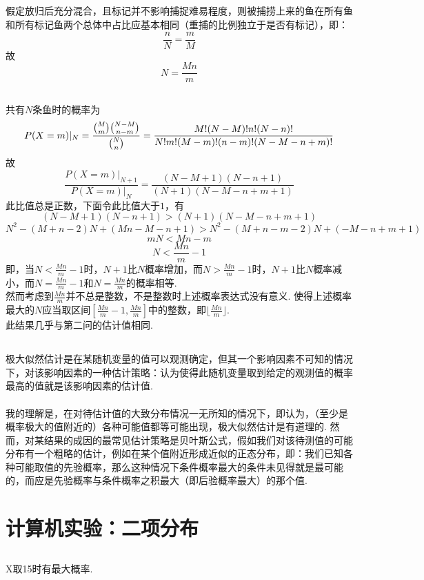\documentclass{article}
\begin{document}
\begin{CJK}{UTF8}{gbsn}
\subsection{}
假定放归后充分混合，且标记并不影响捕捉难易程度，则被捕捞上来的鱼在所有鱼和所有标记鱼两个总体中占比应基本相同（重捕的比例独立于是否有标记），即：
$$\frac{n}{N}=\frac{m}{M}$$
故
$$N=\frac{Mn}{m}$$
\subsection{}
共有$N$条鱼时的概率为
$$ P(X=m)|_{N}=\frac{\tbinom{M}{m}\tbinom{N-M}{n-m}}{\tbinom{N}{n}}=\frac{M!(N-M)!n!(N-n)!}{N!m!(M-m)!(n-m)!(N-M-n+m)!}$$
故
$$ \frac{P(X=m)|_{N+1}}{P(X=m)|_{N}}=\frac{(N-M+1)(N-n+1)}{(N+1)(N-M-n+m+1)}$$
此比值总是正数，下面令此比值大于$1$，有
$$ (N-M+1)(N-n+1)>(N+1)(N-M-n+m+1) $$
$$ N^{2}-(M+n-2)N+(Mn-M-n+1)>N^{2}-(M+n-m-2)N+(-M-n+m+1) $$
$$ mN<Mn-m $$
$$ N<\frac{Mn}{m}-1$$
即，当$N<\frac{Mn}{m}-1$时，$N+1$比$N$概率增加，而$N>\frac{Mn}{m}-1$时，$N+1$比$N$概率减小，而$N=\frac{Mn}{m}-1$和$N=\frac{Mn}{m}$的概率相等.
\\然而考虑到$\frac{Mn}{m}$并不总是整数，不是整数时上述概率表达式没有意义. 使得上述概率最大的$N$应当取区间$[\frac{Mn}{m}-1,\frac{Mn}{m}]$中的整数，即$\lfloor\frac{Mn}{m}\rfloor$.
\\此结果几乎与第二问的估计值相同.
\subsection{}
极大似然估计是在某随机变量的值可以观测确定，但其一个影响因素不可知的情况下，对该影响因素的一种估计策略：认为使得此随机变量取到给定的观测值的概率最高的值就是该影响因素的估计值.
\\\\
我的理解是，在对待估计值的大致分布情况一无所知的情况下，即认为，（至少是概率极大的值附近的）各种可能值都等可能出现，极大似然估计是有道理的. 然而，对某结果的成因的最常见估计策略是贝叶斯公式，假如我们对该待测值的可能分布有一个粗略的估计，例如在某个值附近形成近似的正态分布，即：我们已知各种可能取值的先验概率，那么这种情况下条件概率最大的条件未见得就是最可能的，而应是先验概率与条件概率之积最大（即后验概率最大）的那个值.
\section{计算机实验：二项分布}
\subsection{}
X取15时有最大概率.

\end{CJK}
\end{document}

